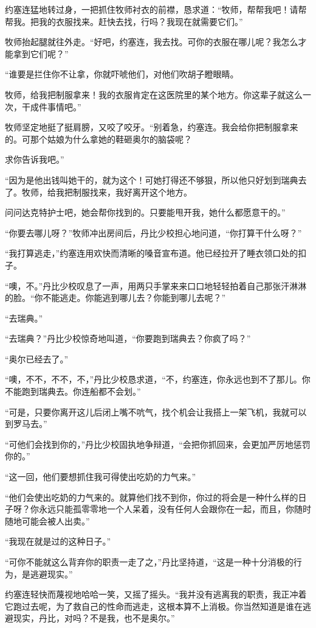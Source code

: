     约塞连猛地转过身，一把抓住牧师衬衣的前襟，恳求道：“牧师，帮帮我吧！请帮帮我。把我的衣服找来。赶快去找，行吗？我现在就需要它们。”

    牧师抬起腿就往外走。“好吧，约塞连，我去找。可你的衣服在哪儿呢？我怎么才能拿到它们呢？”

    “谁要是拦住你不让拿，你就吓唬他们，对他们吹胡子瞪眼睛。

    牧师，给我把制服拿来！我的衣服肯定在这医院里的某个地方。你这辈子就这么一次，干成件事情吧。”

    牧师坚定地挺了挺肩膀，又咬了咬牙。“别着急，约塞连。我会给你把制服拿来的。可那个姑娘为什么拿她的鞋砸奥尔的脑袋呢？

    求你告诉我吧。”

    “因为是他出钱叫她干的，就为这个！可她打得还不够狠，所以他只好划到瑞典去了。牧师，给我把制服找来，我好离开这个地方。

    问问达克特护士吧，她会帮你找到的。只要能甩开我，她什么都愿意干的。”

    “你要去哪儿呀？”牧师冲出房间后，丹比少校担心地问道，“你打算干什么呀？”

    “我打算逃走，”约塞连用欢快而清晰的嗓音宣布道。他已经拉开了睡衣领口处的扣子。

    “噢，不。”丹比少校叹息了一声，用两只手掌来来口口地轻轻拍着自己那张汗淋淋的脸。“你不能逃走。你能逃到哪儿去？你能到哪儿去呢？”

    “去瑞典。”

    “去瑞典？”丹比少校惊奇地叫道，“你要跑到瑞典去？你疯了吗？”

    “奥尔已经去了。”

    “噢，不不，不不，不，”丹比少校恳求道，“不，约塞连，你永远也到不了那儿。你不能跑到瑞典去。你连船都不会划。”

    “可是，只要你离开这儿后闭上嘴不吭气，找个机会让我搭上一架飞机，我就可以到罗马去。”

    “可他们会找到你的，”丹比少校固执地争辩道，“会把你抓回来，会更加严厉地惩罚你的。”

    “这一回，他们要想抓住我可得使出吃奶的力气来。”

    “他们会使出吃奶的力气来的。就算他们找不到你，你过的将会是一种什么样的日子呀？你永远只能孤零零地一个人呆着，没有任何人会跟你在一起，而且，你随时随地可能会被人出卖。”

    “我现在就是过的这种日子。”

    “可你不能就这么背弃你的职责一走了之，”丹比坚持道，“这是一种十分消极的行为，是逃避现实。”

    约塞连轻快而蔑视地哈哈一笑，又摇了摇头。“我并没有逃离我的职责，我正冲着它跑过去呢，为了救自己的性命而逃走，这根本算不上消极。你当然知道是谁在逃避现实，丹比，对吗？不是我，也不是奥尔。”

